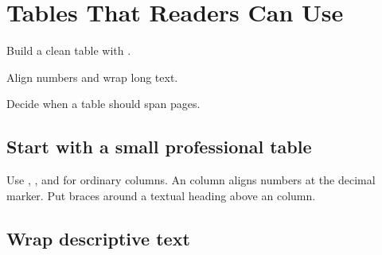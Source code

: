 \chapter{Tables That Readers Can Use}
\label{chap:tables}

\begin{learningoutcomes}
  \item Build a clean table with .
  \item Align numbers and wrap long text.
  \item Decide when a table should span pages.
\end{learningoutcomes}

\section{Start with a small professional table}


Use , , and  for ordinary columns. An 
 column aligns numbers at the decimal marker. Put braces around a
textual heading above an  column.

\section{Wrap descriptive text}

